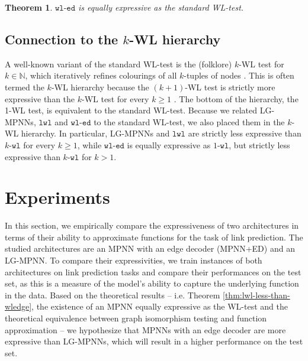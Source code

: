 \documentclass{article}
\newtheorem{theorem}{Theorem}
\newcommand{\kwl}[1][k]{#1\texttt{-wl}}
\newcommand{\wledge}{\texttt{wl-ed}}
\newcommand{\lwl}{\texttt{lwl}}
\newcommand{\mbn}{\mathbb{N}}
\begin{document}
\begin{theorem} \label{thm:wledge-equal-to-wl}
    $\wledge$ is equally expressive as the standard WL-test.
\end{theorem}


\subsection{Connection to the $k$-WL hierarchy}

A well-known variant of the standard WL-test is the (folklore) $k$-WL test for $k\in\mbn$, which iteratively refines colourings of all $k$-tuples of nodes \cite{immerman1990describing}. This is often termed the $k$-WL hierarchy because the $(k+1)$-WL test is strictly more expressive than the $k$-WL test for every $k\geq 1$ \cite{cai1992optimal}. The bottom of the hierarchy, the 1-WL test, is equivalent to the standard WL-test.
Because we related LG-MPNNs, $\lwl$ and $\wledge$ to the standard WL-test, we also placed them in the $k$-WL hierarchy. In particular, LG-MPNNs and $\lwl$ are strictly less expressive than $\kwl$ for every $k\geq 1$, while $\wledge$ is equally expressive as $\kwl[1]$, but strictly less expressive than $\kwl$ for $k> 1$.



\section{Experiments}

In this section, we empirically compare the expressiveness of two architectures in terms of their ability to approximate functions for the task of link prediction.
The studied architectures are an MPNN with an edge decoder (MPNN+ED) and an LG-MPNN.
To compare their expressivities, we train instances of both architectures on link prediction tasks and compare their performances on the test set, as this is a measure of the model's ability to capture the underlying function in the data.
Based on the theoretical results -- i.e. Theorem \ref{thm:lwl-less-than-wledge}, the existence of an MPNN equally expressive as the WL-test \cite{xu2018powerful} and the theoretical equivalence between graph isomorphism testing and function approximation \cite{chen2019equivalence} -- we hypothesize that MPNNs with an edge decoder are more expressive than LG-MPNNs, which will result in a higher performance on the test set. 
\end{document}
